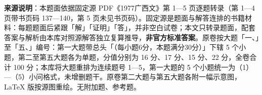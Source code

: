 


\begin{gktip}
\textbf{来源说明}：本题面依据固定源 PDF《1977广西文》第 1—5 页逐题转录（第 1—4 页带书页码 137—140，第 5 页未见书页码）。固定源是题面与解答连排的书籍材料：每题题面后紧跟「解」「证明」「答」，并非空白试卷；本文只转录题面，配套答案与解析由本库对照源解答独立复算推导，\textbf{非官方标准答案}。原卷按大题「一、」至「五、」编号：第一大题带总头「（每小题6分，本题满分30分）」下辖 5 个小题，第二至第五大题各为单题，分值分别为 16 分、17 分、15 分、22 分，全卷合计 100 分；本库将大题重排为连续题号 1—5，第一大题的 5 个小题统一为（1）—（5）小问格式，未增删题干。原卷第二大题与第五大题各附一幅示意图，LaTeX 版按源图重绘。无附加题、参考题。
\end{gktip}

\par\medskip

